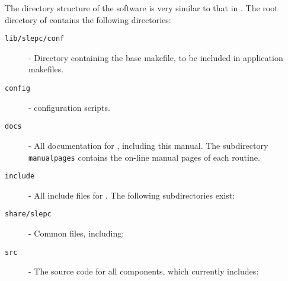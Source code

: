 The directory structure of the \slepc software is very similar to that in \petsc. The root directory of \slepc contains the following directories:
\begin{description}
\item[\texttt{lib/slepc/conf}] - Directory containing the base \slepc makefile, to be included in application makefiles.
\item[\texttt{config}] - \slepc configuration scripts.
\item[\texttt{docs}] - All documentation for \slepc, including this manual. The subdirectory \texttt{manualpages} contains the on-line manual pages of each \slepc routine.
\item[\texttt{include}] - All include files for \slepc. The following subdirectories exist:
\item[\texttt{share/slepc}] - Common files, including:
\item[\texttt{src}] - The source code for all \slepc components, which currently includes:

\end{description}
